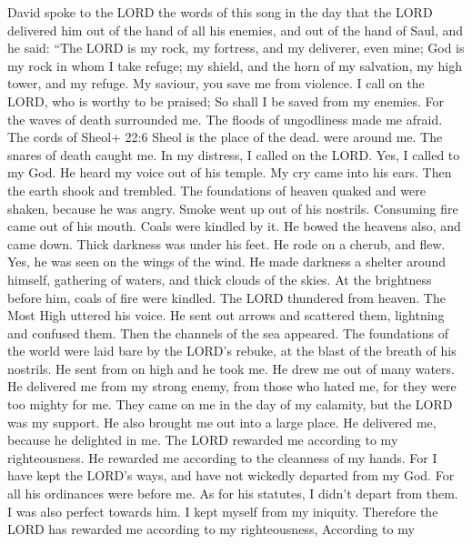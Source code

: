  David spoke to the LORD the words of this song in the day
that the LORD delivered him out of the hand of all his enemies, and out
of the hand of Saul,  and he said: ``The LORD is my rock, my
fortress, and my deliverer, even mine;  God is my rock in
whom I take refuge; my shield, and the horn of my salvation, my high
tower, and my refuge. My saviour, you save me from violence.
 I call on the LORD, who is worthy to be praised; So shall I
be saved from my enemies.  For the waves of death surrounded
me. The floods of ungodliness made me afraid.  The cords of
Sheol+ 22:6 Sheol is the place of the dead. were around me. The snares
of death caught me.  In my distress, I called on the LORD.
Yes, I called to my God. He heard my voice out of his temple. My cry
came into his ears.  Then the earth shook and trembled. The
foundations of heaven quaked and were shaken, because he was angry.
 Smoke went up out of his nostrils. Consuming fire came out
of his mouth. Coals were kindled by it.  He bowed the
heavens also, and came down. Thick darkness was under his feet.
 He rode on a cherub, and flew. Yes, he was seen on the
wings of the wind.  He made darkness a shelter around
himself, gathering of waters, and thick clouds of the skies.
 At the brightness before him, coals of fire were kindled.
 The LORD thundered from heaven. The Most High uttered his
voice.  He sent out arrows and scattered them, lightning
and confused them.  Then the channels of the sea appeared.
The foundations of the world were laid bare by the LORD's rebuke, at the
blast of the breath of his nostrils.  He sent from on high
and he took me. He drew me out of many waters.  He
delivered me from my strong enemy, from those who hated me, for they
were too mighty for me.  They came on me in the day of my
calamity, but the LORD was my support.  He also brought me
out into a large place. He delivered me, because he delighted in me.
 The LORD rewarded me according to my righteousness. He
rewarded me according to the cleanness of my hands.  For I
have kept the LORD's ways, and have not wickedly departed from my God.
 For all his ordinances were before me. As for his
statutes, I didn't depart from them.  I was also perfect
towards him. I kept myself from my iniquity.  Therefore the
LORD has rewarded me according to my righteousness, According to my
